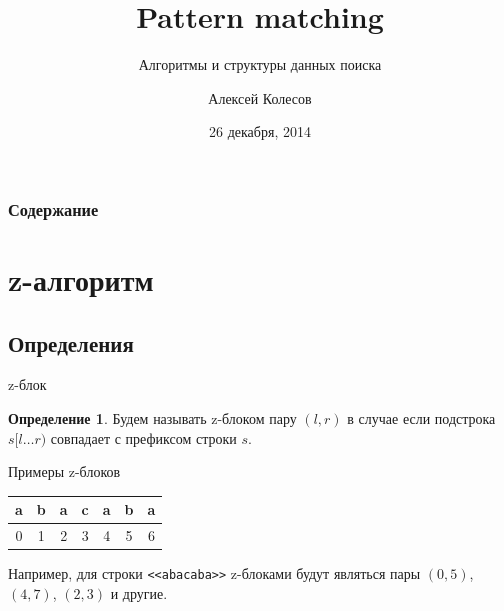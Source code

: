 \documentclass{beamer}
\subtitle[Алгоритмы и структуры данных поиска]{Алгоритмы и структуры данных поиска}
\title[Pattern matching]{Pattern matching}
\author{Алексей Колесов}
\institute{ШАД 2015. Минск}
\date{26 декабря, 2014}
\theoremstyle{definition}
\newtheorem{mydef}[theorem]{Определение}
\begin{document}
\begin{frame}
\titlepage
\end{frame}

\begin{frame}
\frametitle{Содержание}
\tableofcontents[currentsection]
\end{frame}

\section{z-алгоритм}
\subsection{Определения}

\begin{frame}{z-блок}

\begin{mydef}
Будем называть \alert{z-блоком} пару $(l, r)$ в случае если подстрока $s[l \ldots r)$ совпадает с префиксом строки $s$. 
\end{mydef}

\begin{exampleblock} {Примеры z-блоков}
\begin{center}
\begin{tabular}{|c|c|c|c|c|c|c|}
\hline 
a & b & a & c & a & b & a \\ 
\hline 
0 & 1 & 2 & 3 & 4 & 5 & 6 \\ 
\hline 
\end{tabular} 
\end{center}

Например, для строки \texttt{<<abacaba>>} z-блоками будут являться пары $(0, 5)$, $(4,7)$, $(2,3)$ и другие.
\end{exampleblock}

\end{frame}
\end{document}
